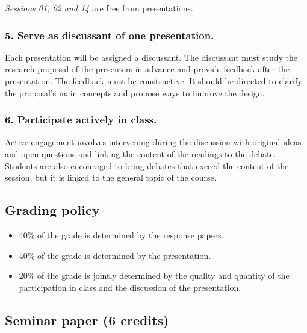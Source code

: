 \documentclass[
  12pt,
]{article}
\begin{document}
\emph{Sessions 01, 02 and 14} are free from presentations.

\hypertarget{serve-as-discussant-of-one-presentation.}{%
\subsubsection{5. Serve as discussant of one
presentation.}\label{serve-as-discussant-of-one-presentation.}}

Each presentation will be assigned a discussant. The discussant must
study the research proposal of the presenters in advance and provide
feedback after the presentation. The feedback must be constructive. It
should be directed to clarify the proposal's main concepts and propose
ways to improve the design.

\hypertarget{participate-actively-in-class.}{%
\subsubsection{6. Participate actively in
class.}\label{participate-actively-in-class.}}

Active engagement involves intervening during the discussion with
original ideas and open questions and linking the content of the
readings to the debate. Students are also encouraged to bring debates
that exceed the content of the session, but it is linked to the general
topic of the course.

\hypertarget{grading-policy}{%
\subsection{Grading policy}\label{grading-policy}}

\begin{itemize}
\item
  40\% of the grade is determined by the response papers.
\item
  40\% of the grade is determined by the presentation.
\item
  20\% of the grade is jointly determined by the quality and quantity of
  the participation in class and the discussion of the presentation.
\end{itemize}

\hypertarget{seminar-paper-6-credits}{%
\subsection{Seminar paper (6 credits)}\label{seminar-paper-6-credits}}
\end{document}
